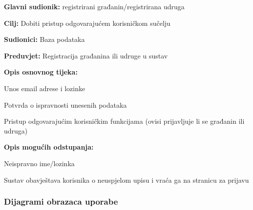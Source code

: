 				\noindent {}
				\begin{packed_item}
					
					\item \textbf{Glavni sudionik:} registrirani građanin/registrirana udruga
					\item  \textbf{Cilj:} Dobiti pristup odgovarajućem korisničkom sučelju
					\item  \textbf{Sudionici:} Baza podataka
					\item  \textbf{Preduvjet:} Registracija građanina ili udruge u sustav
					\item  \textbf{Opis osnovnog tijeka:}
					
					\item[] \begin{packed_enum}
						
						\item Unos email adrese i lozinke
						\item Potvrda o ispravnosti unesenih podataka
						\item Pristup odgovarajućim korisničkim funkcijama (ovisi prijavljuje li se građanin ili udruga)
					\end{packed_enum}
					
					\item  \textbf{Opis mogućih odstupanja:}
					
					\item[] \begin{packed_item}
						
						\item [2.a] Neispravno ime/lozinka
						\item[] \begin{packed_enum}
							
							\item Sustav obavještava korisnika o neuspjelom upisu i vraća ga na stranicu za prijavu
							
						\end{packed_enum}
					\end{packed_item}
				\end{packed_item}
				
		
				                                                                 
				
					
				\subsubsection{Dijagrami obrazaca uporabe}
					
